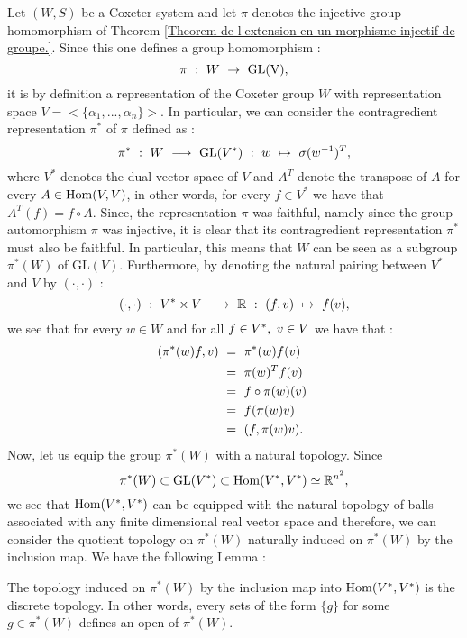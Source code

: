 Let $(W,S)$ be a Coxeter system and let $\pi$ denotes the injective group homomorphism of Theorem \ref{Theorem de l'extension en un morphisme injectif de groupe.}. Since this one defines a group homomorphism :
\begin{equation}
\pi\text{ }:\text{ } W\text{ }\rightarrow\text{ }\mbox{GL(V)},
\end{equation}
it is by definition a representation of the Coxeter group $W$ with representation space $V=<\{\alpha_1,...,\alpha_n\}>$. In particular, we can consider the contragredient representation $\pi^*$ of $\pi$ defined as :
\begin{equation}
\pi^*\text{ }:\text{ } W\text{ }\longrightarrow\text{ } \mbox{GL}(V^*)\text{ } :\text{ } w\text{ } \mapsto\text{ } \sigma(w^{-1})^T,
\end{equation}
where $V^*$ denotes the dual vector space of $V$ and $A^T$ denote the transpose of $A$ for every $A\in \operatorname{Hom}(V,V)$, in other words, for every $f\in V^*$ we have that $A^T(f)=f\circ A$. Since, the representation $\pi$ was faithful, namely since the group automorphism $\pi$ was injective, it is clear that its contragredient representation $\pi^*$ must also be faithful. In particular, this means that $W$ can be seen as a subgroup $\pi^*(W)$ of $\mbox{GL}(V)$. Furthermore, by denoting the natural pairing between $V^*$ and $V$ by $(\cdot,\cdot)$ :
\begin{equation}
(\cdot,\cdot)\text{ }:\text{ } V^*\times V\text{ }\longrightarrow\text{ } \mathbb R\text{ } :\text{ } (f,v)\text{ } \mapsto\text{ } f(v),
\end{equation}
we see that for every $w\in W$ and for all $f\in V^*,\text{ } v\in V$ we have that :
\begin{equation}
\begin{split}
(\pi^*(w)f,v)\text{ }&=\text{ } \pi^*(w)f(v)\\
&=\text{ } \pi(w)^Tf(v)\text{ }\\
&=\text{ } f\circ\pi(w)(v)\text{ }\\
&=\text{ } f(\pi(w)v)\text{ }\\
&=\text{ } (f,\pi(w)v).
\end{split}
\end{equation}
Now, let us equip the group $\pi^*(W)$ with a natural topology. Since
\begin{equation}
\pi^*(W)\subset \mbox{GL}(V^*)\subset\operatorname{Hom}(V^*,V^*)\simeq\mathbb R^{n^2},
\end{equation}
we see that $\operatorname{Hom}(V^*,V^*)$ can be equipped with the natural topology of balls associated with any finite dimensional real vector space and therefore, we can consider the quotient topology on $\pi^*(W)$ naturally induced on $\pi^*(W)$ by the inclusion map. We have the following Lemma :
\begin{lemma}
	The topology induced on $\pi^*(W)$ by the inclusion map into $\operatorname{Hom}(V^*,V^*)$ is the discrete topology. In other words, every sets of the form $\{g\}$ for some $g\in \pi^*(W)$ defines an open of $\pi^*(W)$.
\end{lemma}
